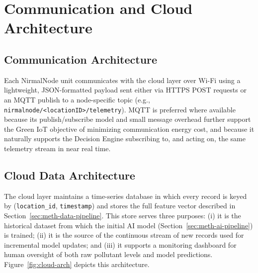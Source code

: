 \FloatBarrier

\section{Communication and Cloud Architecture}
\label{sec:meth-cloud}

\subsection{Communication Architecture}
Each NirmalNode unit communicates with the cloud layer over Wi-Fi using a lightweight, JSON-formatted payload sent either via HTTPS POST requests or an MQTT publish to a node-specific topic (e.g., \texttt{nirmalnode/<locationID>/telemetry}). MQTT is preferred where available because its publish/subscribe model and small message overhead further support the Green IoT objective of minimizing communication energy cost, and because it naturally supports the Decision Engine subscribing to, and acting on, the same telemetry stream in near real time.

\subsection{Cloud Data Architecture}
The cloud layer maintains a time-series database in which every record is keyed by (\texttt{location\_id}, \texttt{timestamp}) and stores the full feature vector described in Section~\ref{sec:meth-data-pipeline}. This store serves three purposes: (i) it is the historical dataset from which the initial AI model (Section~\ref{sec:meth-ai-pipeline}) is trained; (ii) it is the source of the continuous stream of new records used for incremental model updates; and (iii) it supports a monitoring dashboard for human oversight of both raw pollutant levels and model predictions. Figure~\ref{fig:cloud-arch} depicts this architecture.

